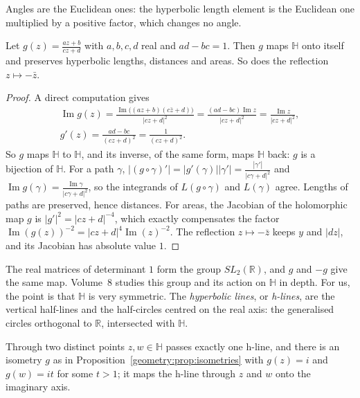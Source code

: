 Angles are the Euclidean ones: the hyperbolic length element is the Euclidean one multiplied by a positive factor, which changes no angle.

\begin{proposition}[isometries]\label{geometry:prop:isometries}
Let $g(z)=\frac{az+b}{cz+d}$ with $a,b,c,d$ real and $ad-bc=1$. Then $g$ maps $\mathbb H$ onto itself and preserves hyperbolic lengths, distances and areas.
So does the reflection $z\mapsto-\bar z$.
\end{proposition}

\begin{proof}
A direct computation gives
\[
\begin{gathered}
\operatorname{Im}g(z)=\frac{\operatorname{Im}\bigl((az+b)(c\bar z+d)\bigr)}{|cz+d|^2}=\frac{(ad-bc)\operatorname{Im}z}{|cz+d|^2}=\frac{\operatorname{Im}z}{|cz+d|^2},\\
g'(z)=\frac{ad-bc}{(cz+d)^2}=\frac1{(cz+d)^2}.
\end{gathered}
\]
So $g$ maps $\mathbb H$ to $\mathbb H$, and its inverse, of the same form, maps $\mathbb H$ back: $g$ is a bijection of $\mathbb H$. For a path $\gamma$,
$|(g\circ\gamma)'|=|g'(\gamma)||\gamma'|=\frac{|\gamma'|}{|c\gamma+d|^2}$ and $\operatorname{Im}g(\gamma)=\frac{\operatorname{Im}\gamma}{|c\gamma+d|^2}$, so the
integrands of $L(g\circ\gamma)$ and $L(\gamma)$ agree. Lengths of paths are preserved, hence distances. For areas, the Jacobian of the holomorphic map $g$ is
$|g'|^2=|cz+d|^{-4}$, which exactly compensates the factor $\operatorname{Im}(g(z))^{-2}=|cz+d|^4\operatorname{Im}(z)^{-2}$. The reflection $z\mapsto-\bar z$
keeps $y$ and $|dz|$, and its Jacobian has absolute value $1$.
\end{proof}

The real matrices of determinant $1$ form the group $SL_2(\mathbb R)$, and $g$ and $-g$ give the same map. Volume~8 studies this group and its action on
$\mathbb H$ in depth. For us, the point is that $\mathbb H$ is very symmetric. The \emph{hyperbolic lines}, or \emph{h-lines}, are the vertical half-lines and
the half-circles centred on the real axis: the generalised circles orthogonal to $\mathbb R$, intersected with $\mathbb H$.

\begin{lemma}\label{geometry:lem:hlines}
Through two distinct points $z,w\in\mathbb H$ passes exactly one h-line, and there is an isometry $g$ as in Proposition~\ref{geometry:prop:isometries} with $g(z)=i$
and $g(w)=it$ for some $t>1$; it maps the h-line through $z$ and $w$ onto the imaginary axis.
\end{lemma}

